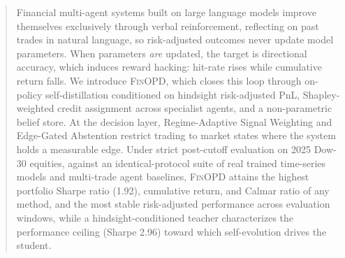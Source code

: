 \begin{abstract}
Financial multi-agent systems built on large language models improve themselves exclusively through verbal reinforcement, reflecting on past trades in natural language, so risk-adjusted outcomes never update model parameters. When parameters \emph{are} updated, the target is directional accuracy, which induces reward hacking: hit-rate rises while cumulative return falls. We introduce \textsc{FinOPD}, which closes this loop through on-policy self-distillation conditioned on hindsight risk-adjusted PnL, Shapley-weighted credit assignment across specialist agents, and a non-parametric belief store. At the decision layer, Regime-Adaptive Signal Weighting and Edge-Gated Abstention restrict trading to market states where the system holds a measurable edge. Under strict post-cutoff evaluation on 2025 Dow-30 equities, against an identical-protocol suite of real trained time-series models and multi-trade agent baselines, \textsc{FinOPD} attains the highest portfolio Sharpe ratio (1.92), cumulative return, and Calmar ratio of any method, and the most stable risk-adjusted performance across evaluation windows, while a hindsight-conditioned teacher characterizes the performance ceiling (Sharpe 2.96) toward which self-evolution drives the student.
\end{abstract}

